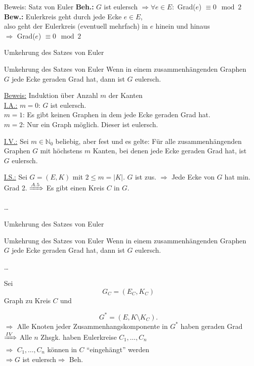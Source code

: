 \begin{frame}{Beweis: Satz von Euler}
\textbf{Beh.:} $G$ ist eulersch $\Rightarrow \forall e \in E: $ Grad($e$) $\equiv 0 \mod 2$ \pause \\
\textbf{Bew.:} Eulerkreis geht durch jede Ecke $e \in E$\pause,  \\
also geht der Eulerkreis (eventuell mehrfach) in $e$ hinein und hinaus \pause \\
$\Rightarrow$ Grad($e$) $\equiv 0 \mod 2$
\end{frame}

\begin{frame}{Umkehrung des Satzes von Euler}
\begin{block}{Umkehrung des Satzes von Euler}
Wenn in einem zusammenhängenden Graphen $G$ jede Ecke geraden Grad hat, dann 
ist $G$ eulersch.
\end{block}
\pause
\underline{Beweis:} Induktion über Anzahl $m$ der Kanten\\
\pause
\underline{I.A.:} $m=0$: $G$ ist eulersch. \cmark\\
\pause
$m=1$: Es gibt keinen Graphen in dem jede Ecke geraden Grad hat. \cmark\\
\pause
$m=2$: Nur ein Graph möglich. Dieser ist eulersch. \cmark\\
\pause

\underline{I.V.:} Sei $m \in \mathbb{N}_0$ beliebig, aber fest und 
es gelte: Für 
alle zusammenhängenden Graphen $G$ mit höchstens $m$ Kanten, bei 
denen jede Ecke geraden Grad hat, ist $G$ eulersch.

\pause

\underline{I.S.:} Sei $G=(E,K)$ mit $2 \leq m  = |K|$. $G$ ist zus. \pause
$\Rightarrow$ Jede Ecke von $G$ hat min. Grad 2. \pause
$\xRightarrow[]{A. 5}$ Es gibt einen Kreis $C$ in $G$.\pause

\dots

\end{frame}

\begin{frame}{Umkehrung des Satzes von Euler}
\begin{block}{Umkehrung des Satzes von Euler}
Wenn in einem zusammenhängenden Graphen $G$ jede Ecke geraden Grad hat, dann 
ist $G$ eulersch.
\end{block}
\dots

Sei
\[G_C = (E_C, K_C) \]
Graph zu Kreis $C$ und

\[G^* = (E, K \setminus K_C).\] \pause
$\Rightarrow$ Alle Knoten jeder Zusammenhangskomponente in $G^*$ haben geraden Grad\\
\pause
$\xRightarrow[]{IV}$ Alle $n$ Zhsgk. haben Eulerkreise $C_1, \dots, C_n$\\
\pause
$\Rightarrow$ $C_1, \dots, C_n$ können in $C$ \enquote{eingehängt} werden\\
\pause
$\Rightarrow G$ ist eulersch\pause $\Rightarrow $ Beh.
\end{frame}

